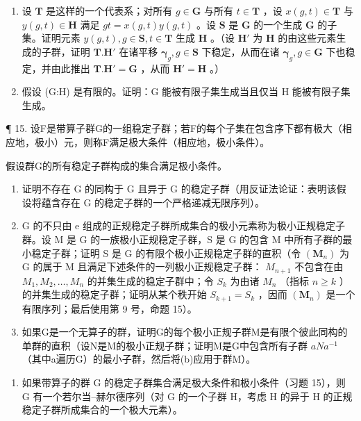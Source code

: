 \begin{enumerate}
\def\labelenumi{(\alph{enumi})}
\item
  设 \(\mathbf{T}\) 是这样的一个代表系；对所有 \(g \in \mathbf{G}\) 与所有 \(t \in \mathbf{T}\) ，设 \(x(g, t) \in \mathbf{T}\) 与 \(y(g, t) \in \mathbf{H}\) 满足 \(gt = x(g, t)y(g, t)\) 。设 \(\mathbf{S}\) 是 \(\mathbf{G}\) 的一个生成 \(\mathbf{G}\) 的子集。证明元素 \(y(g, t), g \in \mathbf{S}, t \in \mathbf{T}\) 生成 \(\mathbf{H}\) 。（设 \(\mathbf{H}'\) 为 \(\mathbf{H}\) 的由这些元素生成的子群，证明 \(\mathbf{T}.\mathbf{H}'\) 在诸平移 \(\boldsymbol{\gamma}_g, g \in \mathbf{S}\) 下稳定，从而在诸 \(\boldsymbol{\gamma}_g, g \in \mathbf{G}\) 下也稳定，并由此推出 \(\mathbf{T}.\mathbf{H}' = \mathbf{G}\) ，从而 \(\mathbf{H}' = \mathbf{H}\) 。）
\item
  假设 (G:H) 是有限的。证明：G 能被有限子集生成当且仅当 H 能被有限子集生成。
\end{enumerate}

¶ 15. 设F是带算子群G的一组稳定子群；若F的每个子集在包含序下都有极大（相应地，极小）元，则称F满足极大条件（相应地，极小条件）。

假设群G的所有稳定子群构成的集合满足极小条件。

\begin{enumerate}
\def\labelenumi{(\alph{enumi})}
\item
  证明不存在 G 的同构于 G 且异于 G 的稳定子群（用反证法论证：表明该假设将蕴含存在 G 的稳定子群的一个严格递减无限序列）。
\item
  G 的不只由 e 组成的正规稳定子群所成集合的极小元素称为极小正规稳定子群。设 M 是 G 的一族极小正规稳定子群，S 是 G 的包含 M 中所有子群的最小稳定子群；证明 S 是 G 的有限个极小正规稳定子群的直积（令 \((\mathbf{M}_{n})\) 为 G 的属于 M 且满足下述条件的一列极小正规稳定子群： \(M_{n+1}\) 不包含在由 \(M_{1}, M_{2}, \ldots, M_{n}\) 的并集生成的稳定子群中；令 \(S_{k}\) 为由诸 \(M_{n}\) （指标 \(n \geqslant k\) ）的并集生成的稳定子群；证明从某个秩开始 \(S_{k+1} = S_{k}\) ，因而 \((\mathbf{M}_{n})\) 是一个有限序列；最后使用第 9 号，命题 15）。
\item
  如果G是一个无算子的群，证明G的每个极小正规子群M是有限个彼此同构的单群的直积（设N是M的极小正规子群；证明M是G中包含所有子群 \(aNa^{-1}\) （其中a遍历G）的最小子群，然后将(b)应用于群M）。
\end{enumerate}

\begin{enumerate}
\def\labelenumi{\arabic{enumi}.}
\setcounter{enumi}{15}
\tightlist
\item
  如果带算子的群 G 的稳定子群集合满足极大条件和极小条件（习题 15），则 G 有一个若尔当–赫尔德序列（对 G 的一个子群 H，考虑 H 的异于 H 的正规稳定子群所成集合的一个极大元素）。
\end{enumerate}

